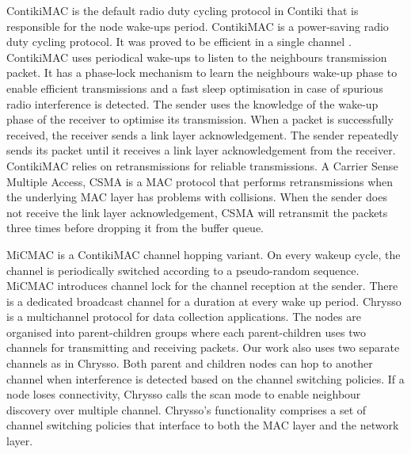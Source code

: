 ContikiMAC \cite{contikimac} is the default radio duty cycling protocol in Contiki that is responsible for the node wake-ups period. ContikiMAC is a power-saving radio duty cycling protocol. It was proved to be efficient in a single channel \cite{micmac}\cite{orpl}. ContikiMAC uses periodical wake-ups to listen to the neighbours transmission packet. It has a phase-lock mechanism to learn the neighbours wake-up phase to enable efficient transmissions and a fast sleep optimisation in case of spurious radio interference is detected. The sender uses the knowledge of the wake-up phase of the receiver to optimise its transmission. When a packet is successfully received, the receiver sends a link layer acknowledgement. The sender repeatedly sends its packet until it receives a link layer acknowledgement from the receiver. ContikiMAC relies on retransmissions for reliable transmissions. A Carrier Sense Multiple Access, CSMA is a MAC protocol that performs retransmissions when the underlying MAC layer has problems with collisions. When the sender does not receive the link layer acknowledgement, CSMA will retransmit the packets three times before dropping it from the buffer queue.




MiCMAC \cite{micmac} is a ContikiMAC \cite{contikimac} channel hopping variant. On every wakeup cycle, the channel is periodically switched according to a pseudo-random sequence. MiCMAC introduces channel lock for the channel reception at the sender. There is a dedicated broadcast channel for a duration at every wake up period. %
Chrysso \cite{chrysso} is a multichannel protocol for data collection applications. The nodes are organised into parent-children groups where each parent-children uses two channels for transmitting and receiving packets. Our work also uses two separate channels as in Chrysso. Both parent and children nodes can hop to another channel when interference is detected based on the channel switching policies. If a node loses connectivity, Chrysso calls the scan mode to enable neighbour discovery over multiple channel. Chrysso’s functionality comprises a set of channel switching policies that interface to both the MAC layer and the network layer.

